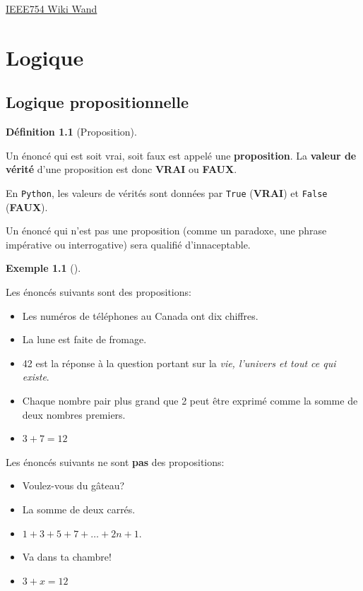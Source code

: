 \documentclass[
  letterpaper,
]{scrbook}
\providecommand{\tightlist}{%
  \setlength{\itemsep}{0pt}\setlength{\parskip}{0pt}}\usepackage{longtable,booktabs,array}
\theoremstyle{plain}
\theoremstyle{definition}
\newtheorem{definition}{Définition}[chapter]
\theoremstyle{definition}
\newtheorem{example}{Exemple}[chapter]
\theoremstyle{remark}
\begin{document}
\href{https://www.wikiwand.com/fr/IEEE\%20754}{IEEE754 Wiki Wand}


\hypertarget{logique}{%
\chapter{Logique}\label{logique}}

\hypertarget{logique-propositionnelle}{%
\section{Logique propositionnelle}\label{logique-propositionnelle}}

\begin{definition}[Proposition]\protect\hypertarget{def-proposition}{}\label{def-proposition}

Un énoncé qui est soit vrai, soit faux est appelé une
\textbf{proposition}. La \textbf{valeur de vérité} d'une proposition est
donc \textbf{VRAI} ou \textbf{FAUX}.

En \texttt{Python}, les valeurs de vérités sont données par
\texttt{True} (\textbf{VRAI}) et \texttt{False} (\textbf{FAUX}).

\end{definition}

Un énoncé qui n'est pas une proposition (comme un paradoxe, une phrase
impérative ou interrogative) sera qualifié d'innaceptable.

\begin{example}[]\protect\hypertarget{exm-propositions}{}\label{exm-propositions}

Les énoncés suivants sont des propositions:

\begin{itemize}
\tightlist
\item
  Les numéros de téléphones au Canada ont dix chiffres.
\item
  La lune est faite de fromage.
\item
  42 est la réponse à la question portant sur la \emph{vie, l'univers et
  tout ce qui existe}.
\item
  Chaque nombre pair plus grand que 2 peut être exprimé comme la somme
  de deux nombres premiers.
\item
  \(3+7=12\)
\end{itemize}

Les énoncés suivants ne sont \textbf{pas} des propositions:

\begin{itemize}
\tightlist
\item
  Voulez-vous du gâteau?
\item
  La somme de deux carrés.
\item
  \(1+3+5+7+\ldots +2n+1\).
\item
  Va dans ta chambre!
\item
  \(3+x=12\)
\end{itemize}

\end{example}
\end{document}

